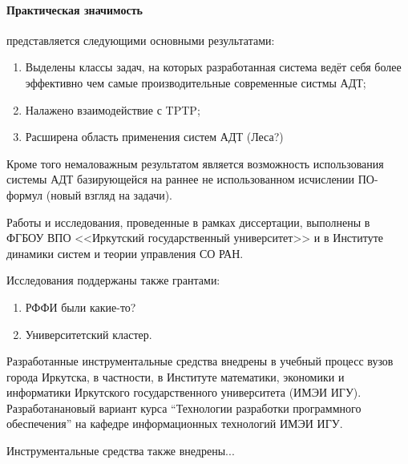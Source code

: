 \paragraph{Практическая значимость}\hspace{-1em} представляется следующими основными результатами:
\begin{enumerate}
\item Выделены классы задач, на которых разработанная система ведёт себя более эффективно чем самые производительные современные систмы АДТ;
\item Налажено взаимодействие с TPTP;
\item Расширена область применения систем АДТ (Леса?)
\end{enumerate}

Кроме того немаловажным результатом является возможность использования системы АДТ базирующейся на раннее не использованном исчислении ПО-формул (новый взгляд на задачи).

Работы и исследования, проведенные в рамках  диссертации, выполнены в ФГБОУ ВПО <<Иркутский государственный университет>> и в Институте динамики систем и теории управления СО РАН. 

Исследования поддержаны также грантами:
\begin{enumerate}
\item РФФИ были какие-то?
\item Университетский кластер.
\end{enumerate}

Разработанные инструментальные средства внедрены в учебный процесс вузов города Иркутска, в частности, в Институте математики, экономики и информатики Иркутского государственного университета (ИМЭИ ИГУ). Разработанановый вариант курса ``Технологии разработки программного обеспечения'' на кафедре информационных технологий ИМЭИ ИГУ.


Инструментальные средства также внедрены...




